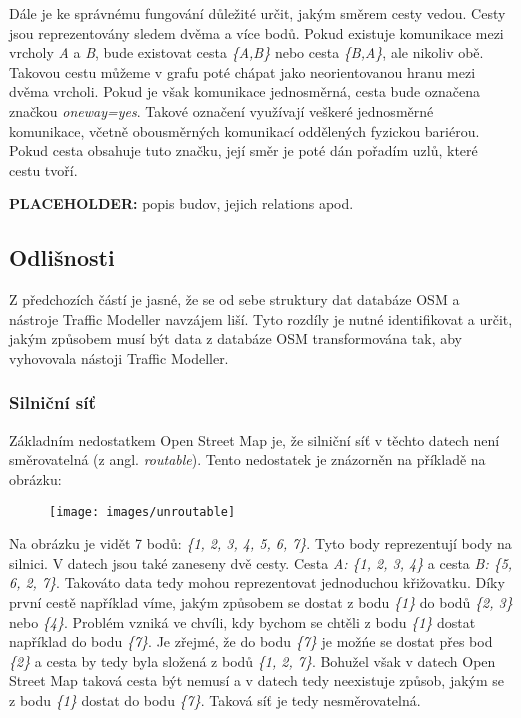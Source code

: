 Dále je ke správnému fungování důležité určit, jakým směrem cesty vedou. Cesty jsou reprezentovány sledem dvěma a více bodů. Pokud existuje komunikace mezi vrcholy \textit{A} a \textit{B}, bude existovat cesta \textit{\{A,B\}} nebo cesta \textit{\{B,A\}}, ale nikoliv obě. Takovou cestu můžeme v grafu poté chápat jako neorientovanou hranu mezi dvěma vrcholi. Pokud je však komunikace jednosměrná, cesta bude označena značkou \textit{oneway=yes}. Takové označení využívají veškeré jednosměrné komunikace, včetně obousměrných komunikací oddělených fyzickou bariérou. Pokud cesta obsahuje tuto značku, její směr je poté dán pořadím uzlů, které cestu tvoří. 

\textbf{PLACEHOLDER:} popis budov, jejich relations apod. 


\subsection{Odlišnosti}

Z předchozích částí je jasné, že se od sebe struktury dat databáze OSM a nástroje Traffic Modeller navzájem liší. Tyto rozdíly je nutné identifikovat a určit, jakým způsobem musí být data z databáze OSM transformována tak, aby vyhovovala nástoji Traffic Modeller. 

\subsubsection{Silniční síť}

Základním nedostatkem Open Street Map je, že silniční síť v těchto datech není směrovatelná (z angl. \textit{routable}). Tento nedostatek je znázorněn na příkladě na obrázku: 

\begin{figure}[ht]
\texttt{[image: images/unroutable]}
\end{figure}

Na obrázku je vidět 7 bodů: \textit{\{1, 2, 3, 4, 5, 6, 7\}}. Tyto body reprezentují body na silnici. V datech jsou také zaneseny dvě cesty. Cesta \textit{A: \{1, 2, 3, 4\}} a cesta \textit{B: \{5, 6, 2, 7\}}. Takováto data tedy mohou reprezentovat jednoduchou křižovatku. Díky první cestě například víme, jakým způsobem se dostat z bodu \textit{\{1\}} do bodů \textit{\{2, 3\}} nebo \textit{\{4\}}. Problém vzniká ve chvíli, kdy bychom se chtěli z bodu \textit{\{1\}} dostat například do bodu \textit{\{7\}}. Je zřejmé, že do bodu \textit{\{7\}} je možńe se dostat přes bod \textit{\{2\}} a cesta by tedy byla složená z bodů \textit{\{1, 2, 7\}}. Bohužel však v datech Open Street Map taková cesta být nemusí a v datech tedy neexistuje způsob, jakým se z bodu \textit{\{1\}} dostat do bodu \textit{\{7\}}. Taková síť je tedy nesměrovatelná.

